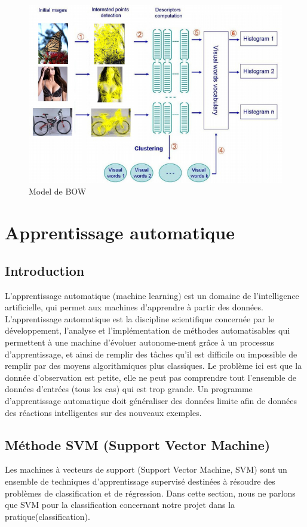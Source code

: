 \begin{figure}[ht!]
\centering
\includegraphics[width=160mm]{images/bow}
\caption{Model de BOW}
\label{overflow}
\end{figure}

\chapter{Apprentissage automatique}
\label{chap:sgd}

\section{Introduction}
L'apprentissage automatique (machine learning) est un domaine de l'intelligence artificielle, qui permet aux machines d'apprendre à partir des données. L'apprentissage automatique est la discipline scientifique concernée par le développement, l'analyse et l'implémentation de méthodes automatisables qui permettent à une machine d'évoluer autonome-ment grâce à un processus d'apprentissage, et ainsi de remplir des tâches qu'il est difficile ou impossible de remplir par des moyens algorithmiques plus classiques. Le problème ici est que la donnée d'observation est petite, elle ne peut pas comprendre tout l'ensemble de données d'entrées (tous les cas) qui est trop grande. Un programme d'apprentissage automatique doit généraliser des données limite afin de données des réactions intelligentes sur des nouveaux exemples.\\

\section{Méthode SVM (Support Vector Machine)}
Les machines à vecteurs de support (Support Vector Machine, SVM) sont un ensemble de techniques d'apprentissage supervisé destinées à résoudre des problèmes de classification et de régression. Dans cette section, nous ne parlons que SVM pour la classification concernant notre projet dans la pratique(classification).\\

